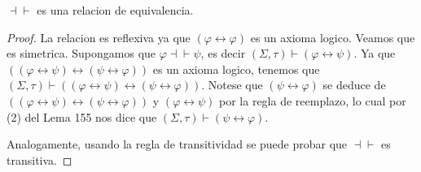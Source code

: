   \begin{lemma}
    \(\dashv \vdash \) es una relacion de equivalencia.
  \end{lemma}
  \begin{proof}
    La relacion es reflexiva ya que \((\varphi \leftrightarrow \varphi )\) es un axioma logico. Veamos que es simetrica. Supongamos que \(\varphi \dashv \vdash \psi \), es decir \((\Sigma ,\tau )\vdash \left( \varphi \leftrightarrow \psi \right) \). Ya que \(((\varphi \leftrightarrow \psi )\leftrightarrow (\psi \leftrightarrow \varphi ))\) es un axioma logico, tenemos que \((\Sigma ,\tau )\vdash ((\varphi \leftrightarrow \psi )\leftrightarrow (\psi \leftrightarrow \varphi ))\). Notese que \(\left( \psi \leftrightarrow \varphi \right) \) se deduce de \(((\varphi \leftrightarrow \psi )\leftrightarrow (\psi \leftrightarrow \varphi ))\) y \((\varphi \leftrightarrow \psi )\) por la regla de reemplazo, lo cual por (2) del Lema 155 nos dice que \((\Sigma ,\tau )\vdash \left( \psi \leftrightarrow \varphi \right) \).

    Analogamente, usando la regla de transitividad se puede probar que \(\dashv \vdash \) es transitiva.
  \end{proof}

